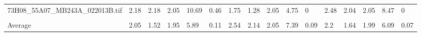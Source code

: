 \begin{tabular}{llllllllllllllll}
 73H08\_55A07\_MB243A\_022013B.tif & 2.18                              & 2.18    & 2.05   & 10.69 & 0.46 & 1.75    & 1.28    & 2.05   & 4.75  & 0    & 2.48     & 2.04    & 2.05   & 8.47 & 0    \\
                                &                                   &         &        &       &      &         &         &        &       &      &          &         &        &      &      \\
 Average                        & 2.05                              & 1.52    & 1.95   & 5.89  & 0.11 & 2.54    & 2.14    & 2.05   & 7.39  & 0.09 & 2.2      & 1.64    & 1.99   & 6.09 & 0.07 \\
\hline
\end{tabular}